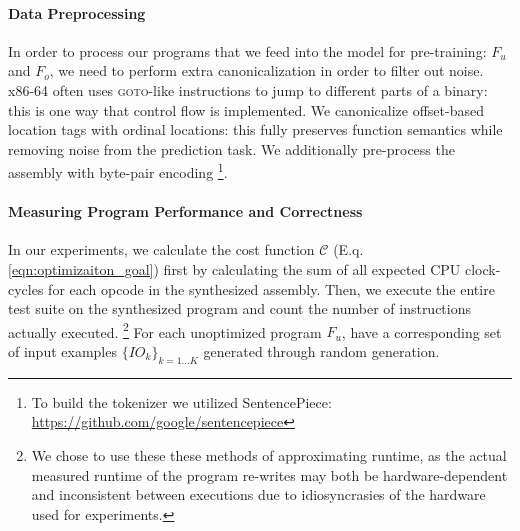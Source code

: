 \documentclass{article}
\begin{document}
\paragraph{Data Preprocessing} In order to process our programs that we feed into the model for pre-training: $F_u$ and $F_o$, we need to perform extra canonicalization in order to filter out noise. x86-64 often uses \textsc{goto}-like instructions to jump to different parts of a binary: this is one way that control flow is implemented. We canonicalize offset-based location tags with ordinal locations: this fully preserves function semantics while removing noise from the prediction task. We additionally pre-process the assembly with byte-pair encoding \citep{sennrich2015neural} \footnote{To build the tokenizer we utilized SentencePiece: \url{https://github.com/google/sentencepiece}}. 


\paragraph{Measuring Program Performance and Correctness} 
In our experiments, we calculate the cost function $\mathcal{C}$ (E.q. \ref{eqn:optimizaiton_goal}) first by calculating the sum of all expected CPU clock-cycles for each opcode in the synthesized assembly. 
Then, we execute the entire test suite on the synthesized program and count the number of instructions actually executed.%
\footnote{We chose to use these these methods of approximating runtime, as the actual measured runtime of the program re-writes may both be hardware-dependent and inconsistent between executions due to idiosyncrasies of the hardware used for experiments.}
For each unoptimized program $F_u$, have a corresponding set of input examples ${\{IO_k\}}_{k=1...K}$ generated through random generation. 

\end{document}
